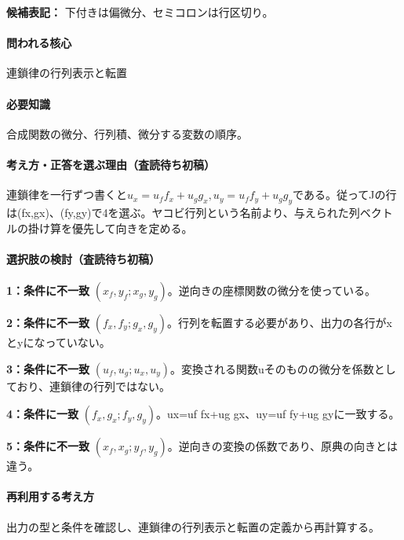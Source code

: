 \noindent\textbf{候補表記：} 下付きは偏微分、セミコロンは行区切り。\par

\paragraph{問われる核心} 連鎖律の行列表示と転置

\paragraph{必要知識} 合成関数の微分、行列積、微分する変数の順序。

\paragraph{考え方・正答を選ぶ理由（査読待ち初稿）} 連鎖律を一行ずつ書くと\(u_x=u_ff_x+u_gg_x,u_y=u_ff_y+u_gg_y\)である。従ってJの行は(fx,gx)、(fy,gy)で4を選ぶ。ヤコビ行列という名前より、与えられた列ベクトルの掛け算を優先して向きを定める。

\paragraph{選択肢の検討（査読待ち初稿）}\mbox{}\par

\noindent\textbf{1：条件に不一致} \((x_f,y_f;x_g,y_g)\)。逆向きの座標関数の微分を使っている。\par

\noindent\textbf{2：条件に不一致} \((f_x,f_y;g_x,g_y)\)。行列を転置する必要があり、出力の各行がxとyになっていない。\par

\noindent\textbf{3：条件に不一致} \((u_f,u_g;u_x,u_y)\)。変換される関数uそのものの微分を係数としており、連鎖律の行列ではない。\par

\noindent\textbf{4：条件に一致} \((f_x,g_x;f_y,g_y)\)。ux=\allowbreak{}uf fx+ug gx、uy=\allowbreak{}uf fy+ug gyに一致する。\par

\noindent\textbf{5：条件に不一致} \((x_f,x_g;y_f,y_g)\)。逆向きの変換の係数であり、原典の向きとは違う。\par

\paragraph{再利用する考え方} 出力の型と条件を確認し、連鎖律の行列表示と転置の定義から再計算する。

